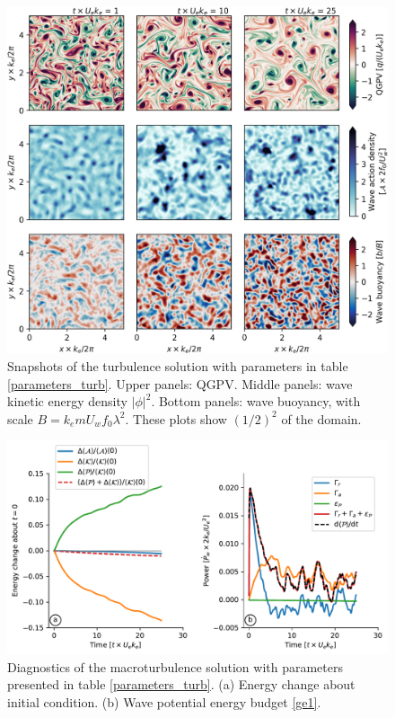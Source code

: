 \documentclass{jfm}
\begin{document}
 \begin{figure}

 \centering
 \includegraphics[width=1.\textwidth]{figs/fig3.png}
 \caption{Snapshots of the  turbulence solution with parameters  in
          table \ref{parameters_turb}. Upper panels: QGPV. Middle panels: wave kinetic energy  density $|\phi|^2$.
         Bottom panels: wave buoyancy, with scale  $B = k_e m U_w f_0 \lambda^2$.
        These plots  show
        $(1/2)^2$ of the  domain.}
         \label{snaps_turb}
 \end{figure}

 \begin{figure}
 \centering
 \includegraphics[width=1.\textwidth]{figs/fig4.pdf}
 \caption{Diagnostics of the macroturbulence solution with parameters presented
           in table \ref{parameters_turb}. (a) Energy change about initial condition.
         (b) Wave potential energy budget \eqref{ge1}.
         }  \label{stats_turb}
 \end{figure}
\end{document}
